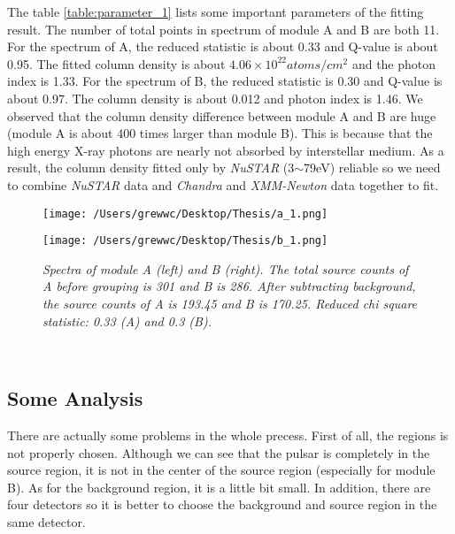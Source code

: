 \documentclass[12pt]{report}
\newcommand{\mycaption}[1]{\caption{\textit{\footnotesize #1}}}
\begin{document}
        \indent
        The table \ref{table:parameter_1} lists some important parameters of the fitting result. 
        The number of total points in spectrum of module A and B are both 11. For the spectrum of A, the 
        reduced statistic is about 0.33 and Q-value is about 0.95. The fitted column density is about 
        $4.06\times 10^{22} atoms/cm^2$ and the photon index is 1.33. For the spectrum of B, the reduced statistic is
        0.30 and Q-value is about 0.97. The column density is about 0.012 and photon index is 1.46. We observed that
        the column density difference between module A and B are huge (module A is about 400 times larger than 
        module B). This 
        is because that the high energy X-ray photons are nearly not absorbed by interstellar medium. As a result, 
        the column density fitted only by \textit{NuSTAR} (3$\sim$79eV) reliable so we need to combine 
        \textit{NuSTAR} data and \textit{Chandra} and \textit{XMM-Newton} data together to fit.\\ 
        \begin{figure}[h]
          \begin{minipage}{0.45\textwidth}
            \begin{center} 
                \texttt{[image: /Users/grewwc/Desktop/Thesis/a\_1.png]}
            \end{center}
            \end{minipage}
          \begin{minipage}{0.45\textwidth}
            \begin{center}
            \texttt{[image: /Users/grewwc/Desktop/Thesis/b\_1.png]}
            \end{center}
          \end{minipage}
          \centering
          \begin{minipage}{0.8\textwidth}
          \mycaption{Spectra of module A (left) and B (right). The total source counts of A before grouping is 
                      301 and B is 286. After subtracting background, the source counts of A is 193.45 and B is
                      170.25. Reduced chi square statistic: 0.33 (A) and 0.3 (B).}
          \label{spectra}
          \end{minipage}
          \end{figure}
          \\
        \subsection*{Some Analysis}
          \indent There are actually some problems in the whole precess. First of all, the regions is not properly 
            chosen. Although we can see that the pulsar is completely in the source region, it is not in the center of 
            the source region (especially for module B). As for the background region, it is a little bit small. 
            In addition, there are four 
            detectors so it is better to choose the background and source region in the same detector. 
\end{document}
